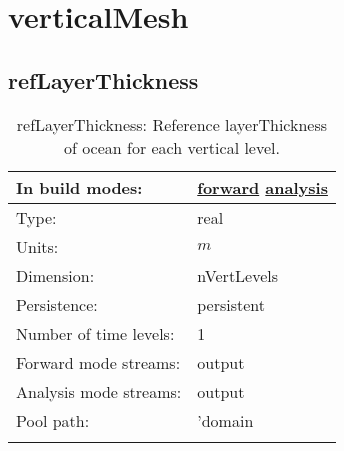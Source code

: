 \section[verticalMesh]{verticalMesh}
\label{sec:var_sec_verticalMesh}
\subsection[refLayerThickness]{refLayerThickness}
\label{subsec:var_sec_verticalMesh_refLayerThickness}
\begin{center}
\begin{longtable}{| p{2.0in} | p{4.0in} |}
        \hline 
        In build modes: & \hyperref[subsec:forward_var_tab_verticalMesh]{forward} \hyperref[subsec:analysis_var_tab_verticalMesh]{analysis} \\
        \hline 
        Type: & real \\
        \hline 
        Units: & $m$ \\
        \hline 
        Dimension: & nVertLevels \\
        \hline 
        Persistence: & persistent \\
        \hline 
        Number of time levels: & 1 \\
        \hline 
		 Forward mode streams: &  output \\
        \hline 
		 Analysis mode streams: &  output \\
        \hline 
            Pool path: & 'domain %
 \\
		 \hline 
    \caption{refLayerThickness: Reference layerThickness of ocean for each vertical level.}
\end{longtable}
\end{center}

